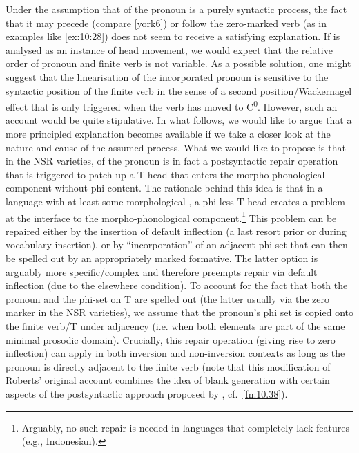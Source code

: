 \documentclass[output=paper]{langsci/langscibook}
\begin{document}
Under the assumption that  of the pronoun is a purely syntactic
process, the fact that it may precede (compare \ref{york6}) or follow the
zero-marked verb (as in examples like \ref{ex:10:28}) does not seem to receive a
satisfying explanation. If  is analysed as an instance of head
movement, we would expect that the relative order of pronoun and finite verb is
not variable. As a possible solution, one might suggest that the linearisation
of the incorporated pronoun is sensitive to the syntactic position of the
finite verb in the sense of a second position\slash Wackernagel effect that is only
triggered when the verb has moved to C\textsuperscript{0}. However, such an account would
be quite stipulative. In what follows, we would like to argue that a more
principled explanation becomes available  if we take a closer look at the
nature and cause of the assumed  process. What we would like to
propose is that in the \gls{NSR} varieties,  of the pronoun is in
fact a postsyntactic repair operation that is triggered to patch up a T head
that enters the morpho-phonological component without phi-content. The
rationale behind this idea is that in a language with at least some
morphological , a phi-less T-head creates a problem at the interface
to the morpho-phonological component.\footnote{Arguably, no such repair is
    needed in languages that completely lack  features (e.g.,
Indonesian).} This problem can be repaired either by the insertion of default
inflection (a last resort prior or during vocabulary insertion), or by
``incorporation'' of an adjacent phi-set that can then be spelled out by an
appropriately marked  formative. The latter option is arguably more
specific/complex and therefore preempts repair via default inflection (due to
the elsewhere condition). To account for the fact that both the pronoun and the
phi-set on T are spelled out (the latter usually via the zero marker in the
\gls{NSR} varieties), we assume that the pronoun's phi set is copied onto the
finite verb/T under adjacency (i.e. when both elements are part of the same
minimal prosodic domain). Crucially, this repair operation (giving rise to zero
inflection) can apply in both inversion and non-inversion contexts as long as
the pronoun is directly adjacent to the finite verb (note that this
modification of Roberts' original account combines the idea of blank generation
with certain aspects of the postsyntactic approach proposed by
\citealt{TripsFuss:2010}, cf.~\cref{fn:10.38}).
\end{document}
